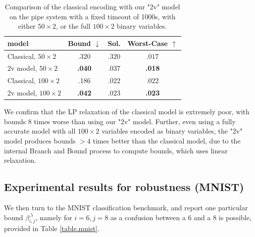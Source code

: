 \begin{table}[h!]
	\begin{tabular}{|l|c|c|c|}\hline\hline
		model &        Bound $\downarrow$ &  Sol. &      Worst-Case $\uparrow$ \\\hline \hline
	Classical, $50 \times 2$ &    $.320$ &  $.320$ & $.017$ 
    \\\hline
    2v model, $50 \times 2$ &    {\bf .040} &  $.037$ & {\bf .018} 
    \\\hline \hline
    Classical, $100 \times 2$ &  .186  &  $.022$ & $.022$ 
    \\\hline
	2v model, $100 \times 2$&     {\bf .042} &  $.023$ &   {\bf .023} 
    \\\hline \hline
	\end{tabular}
	\caption{Comparison of the classical encoding with our "2v" model on the pipe system with a fixed timeout of 1000s, with either $50 \times 2$, 
    or the full $100 \times 2$ binary variables.}
    \label{table.classical}
\end{table}

We confirm that the LP relaxation of the classical model is extremely poor, with bounds $8$ times worse than using our "2v" model. Further, even using a fully accurate model with all $100 \times 2$ variables encoded as binary variables, the "2v" model produces bounds $>4$ times better than the classical model, due to the internal Branch and Bound process to compute bounds, which uses linear relaxation.

	\subsection{Experimental results for robustness (MNIST)}
	
We then turn to the MNIST classification benchmark, and report one particular bound $\beta^{.5}_{i,j}$, namely for $i=6,j=8$ as a confusion between a 6 and a 8 is possible, provided in Table \ref{table.mnist}.
	
